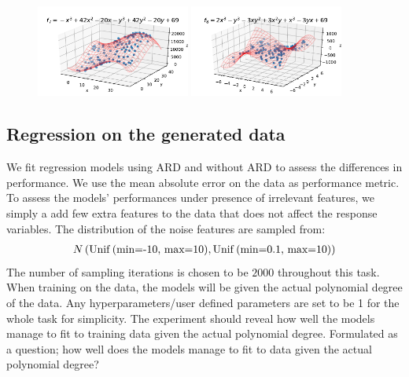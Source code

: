 \documentclass[12pt]{article}
\begin{document}
\begin{figure}[H]
            \includegraphics[width=0.45\textwidth, height=0.22\textheight]{f_7_3d.pdf}
            \includegraphics[width=0.45\textwidth, height=0.22\textheight]{f_8_3d.pdf}
            \caption{} \label{fig:simfuncs}
        \end{figure}

    \subsection{Regression on the generated data}
        We fit regression models using ARD and without ARD to assess the differences in performance. We use the mean absolute error on the data as performance metric. To assess the models' performances under presence of irrelevant features, we simply a add few extra features to the data that does not affect the response variables. The distribution of the noise features are sampled from:
        \begin{align*}
            N\left(\operatorname{Unif}\text{(min=-10, max=10)}, \operatorname{Unif}\text{(min=0.1, max=10)}\right)
        \end{align*}
        The number of sampling iterations is chosen to be $2000$ throughout this task. When training on the data, the models will be given the actual polynomial degree of the data. Any hyperparameters/user defined parameters are set to be 1 for the whole task for simplicity. The experiment should reveal how well the models manage to fit to training data given the actual polynomial degree. Formulated as a question; how well does the models manage to fit to data given the actual polynomial degree?
\end{document}
